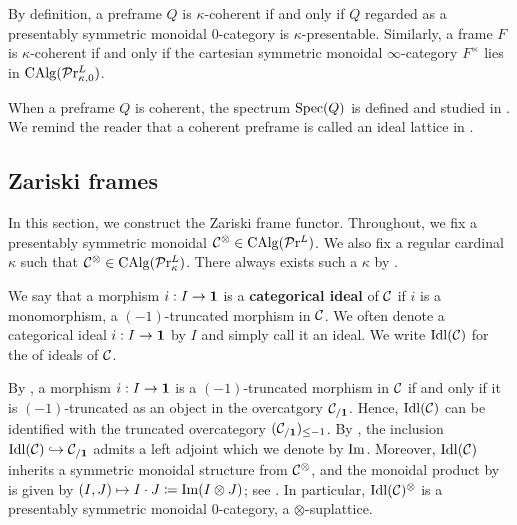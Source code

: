 \documentclass[10pt,a4paper,oneside]{article}
\begin{document}
\begin{rem}\label{rem:kcoh}
By definition, a preframe $Q$ is $\kappa$-coherent if and only if $Q$ regarded as a presentably symmetric monoidal $0$-category is $\kappa$-presentable. Similarly, a frame $F$ is $\kappa$-coherent if and only if the cartesian symmetric monoidal $\infty$-category $F^\times $ lies in $ \operatorname{CAlg}(\mathcal{P}\mathrm{r}^L_{\kappa,0})$.
\end{rem}

\begin{rem}
When a preframe $Q$ is coherent, the spectrum $\operatorname{Spec}(Q)$ is defined and studied in \cite{BuanKrauseSolberg07}. We remind the reader that a coherent preframe is called an ideal lattice in \cite{BuanKrauseSolberg07}.
\end{rem}

\subsection{Zariski frames}\label{sec2.1}
In this section, we construct the Zariski frame functor. Throughout, we fix a presentably symmetric monoidal \infcat $\mathcal{C}^\otimes\in\operatorname{CAlg}(\mathcal{P}\mathrm{r}^L)$. We also fix a regular cardinal $\kappa$ such that $\mathcal{C}^\otimes\in\operatorname{CAlg}(\mathcal{P}\mathrm{r}^L_\kappa)$. There always exists such a $\kappa$ by \cite[Lemma 5.3.2.12]{ha}.

\begin{de}\label{def:ideal}
We say that a morphism $i: I\to\mathbf{1}$ is a \textbf{categorical ideal} of $\mathcal{C}$ if $i$ is a monomorphism, \ie a $(-1)$-truncated morphism in $\mathcal{C}$. We often denote a categorical ideal $i: I\to\mathbf{1}$ by $I$ and simply call it an ideal. We write $\operatorname{Idl}(\mathcal{C})$ for the \infcat of ideals of $\mathcal{C}$.
\end{de}

\begin{rem}
By \cite[Remark~5.5.6.10]{htt}, a morphism $i: I\to\mathbf{1}$ is a $(-1)$-truncated morphism in $\mathcal{C}$ if and only if it is $(-1)$-truncated as an object in the overcatgory $\mathcal{C}_{/\mathbf{1}}$. Hence, $\operatorname{Idl}(\mathcal{C})$ can be identified with the truncated overcategory $(\mathcal{C}_{/\mathbf{1}})_{\leq-1}$. By \cite[Remark~5.5.6.18]{htt}, the inclusion $\operatorname{Idl}(\mathcal{C})\hookrightarrow \mathcal{C}_{/\mathbf{1}}$ admits a left adjoint which we denote by $\operatorname{Im}$. Moreover, $\operatorname{Idl}(\mathcal{C})$ inherits a symmetric monoidal structure from $\mathcal C^\otimes$, and the monoidal product by is given by $(I,J)\mapsto I\cdot J \coloneqq \operatorname{Im}(I\otimes J)$; see \cite[.2 and 4.8.2.15]{ha}. In particular, $\operatorname{Idl}(\mathcal{C})^\otimes$ is a presentably symmetric monoidal $0$-category, \ie a $\otimes$-suplattice.
\end{rem}
\end{document}
